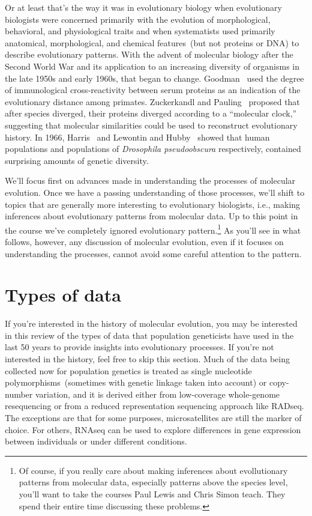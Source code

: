 \documentclass[12pt]{article}
\begin{document}
Or at least that's the way it was in evolutionary biology when
evolutionary biologists were concerned primarily with the evolution of
morphological, behavioral, and physiological traits and when
systematists used primarily anatomical, morphological, and chemical
features~(but not proteins or DNA) to describe evolutionary
patterns. With the advent of molecular biology after the Second World
War and its application to an increasing diversity of organisms in the
late 1950s and early 1960s, that began to
change. Goodman~\cite{Goodman62} used the degree of immunological
cross-reactivity between serum proteins as an indication of the
evolutionary distance among primates. Zuckerkandl and
Pauling~\cite{Zuckerkandl-Pauling65} proposed that after species
diverged, their proteins diverged according to a ``molecular
clock,'' suggesting that molecular similarities
could be used to reconstruct evolutionary history. In 1966,
Harris~\cite{Harris66} and Lewontin and
Hubby~\cite{Hubby-Lewontin66,Lewontin-Hubby66} showed that human
populations and populations of {\it Drosophila pseudoobscura\/}
respectively, contained surprising amounts of genetic
diversity.

We'll focus first on advances made in understanding the processes of
molecular evolution. Once we have a passing understanding of those
processes, we'll shift to topics that are generally more interesting
to evolutionary biologists, i.e., making inferences about evolutionary
patterns from molecular data. Up to this point in the course we've
completely ignored evolutionary pattern.\footnote{Of course, if you
  really care about making inferences about evollutionary patterns
  from molecular data, especially patterns above the species level,
  you'll want to take the courses Paul Lewis and Chris Simon
  teach. They spend their entire time discussing these problems.}  As
you'll see in what follows, however, any discussion of molecular
evolution, even if it focuses on understanding the processes, cannot
avoid some careful attention to the pattern.

\section*{Types of data} 

If you're interested in the history of molecular evolution, you may be
interested in this review of the types of data that population
geneticists have used in the last 50 years to provide insights into
evolutionary processes. If you're not interested in the history, feel
free to skip this section. Much of the data being collected now for
population genetics is treated as single nucleotide
polymorphisms~(sometimes with genetic linkage taken into account) or
copy-number variation, and it is derived either from low-coverage
whole-genome resequencing or from a reduced representation sequencing
approach like RADseq. The exceptions are that for some purposes,
microsatellites are still the marker of choice. For others, RNAseq can
be used to explore differences in gene expression between individuals
or under different conditions.
\end{document}
